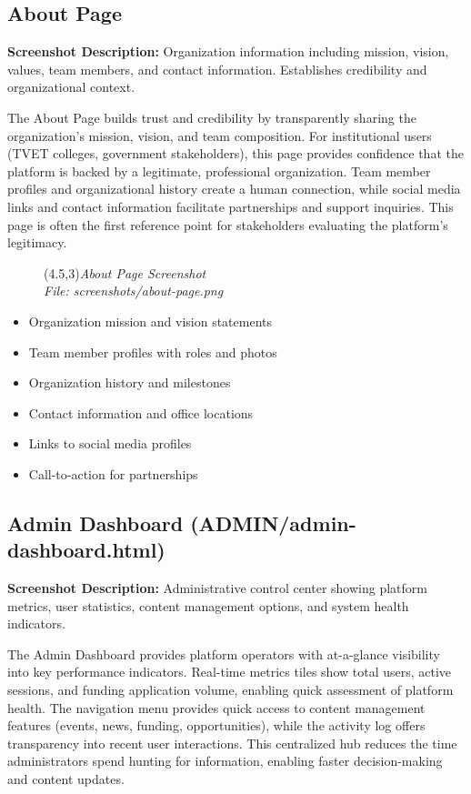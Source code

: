 \documentclass[a4paper,12pt]{article}
\begin{document}
\subsection{About Page}
\textbf{Screenshot Description:} Organization information including mission, vision, values, team members, and contact information. Establishes credibility and organizational context.

The About Page builds trust and credibility by transparently sharing the organization's mission, vision, and team composition. For institutional users (TVET colleges, government stakeholders), this page provides confidence that the platform is backed by a legitimate, professional organization. Team member profiles and organizational history create a human connection, while social media links and contact information facilitate partnerships and support inquiries. This page is often the first reference point for stakeholders evaluating the platform's legitimacy.

\begin{figure}[h]
    \centering
    \framebox(4.5,3){\textit{About Page Screenshot}}\\
    \small\textit{File: screenshots/about-page.png}
\end{figure}

\begin{itemize}
    \item Organization mission and vision statements
    \item Team member profiles with roles and photos
    \item Organization history and milestones
    \item Contact information and office locations
    \item Links to social media profiles
    \item Call-to-action for partnerships
\end{itemize}

\subsection{Admin Dashboard (ADMIN/admin-dashboard.html)}
\textbf{Screenshot Description:} Administrative control center showing platform metrics, user statistics, content management options, and system health indicators.

The Admin Dashboard provides platform operators with at-a-glance visibility into key performance indicators. Real-time metrics tiles show total users, active sessions, and funding application volume, enabling quick assessment of platform health. The navigation menu provides quick access to content management features (events, news, funding, opportunities), while the activity log offers transparency into recent user interactions. This centralized hub reduces the time administrators spend hunting for information, enabling faster decision-making and content updates.
\end{document}
